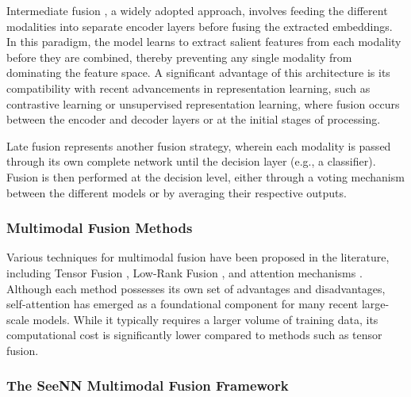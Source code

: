 Intermediate fusion \cite{huang_fusion_2020}, a widely adopted approach, involves feeding the different modalities into separate encoder layers before fusing the extracted embeddings. In this paradigm, the model learns to extract salient features from each modality before they are combined, thereby preventing any single modality from dominating the feature space. A significant advantage of this architecture is its compatibility with recent advancements in representation learning, such as contrastive learning or unsupervised representation learning, where fusion occurs between the encoder and decoder layers or at the initial stages of processing.

Late fusion \cite{huang_fusion_2020} represents another fusion strategy, wherein each modality is passed through its own complete network until the decision layer (e.g., a classifier). Fusion is then performed at the decision level, either through a voting mechanism between the different models or by averaging their respective outputs.

\subsubsection{Multimodal Fusion Methods}

Various techniques for multimodal fusion have been proposed in the literature, including Tensor Fusion \cite{zadeh2017tensorfusionnetworkmultimodal}, Low-Rank Fusion \cite{liu2018efficientlowrankmultimodalfusion}, and attention mechanisms \cite{NEURIPS2021_76ba9f56}. Although each method possesses its own set of advantages and disadvantages, self-attention has emerged as a foundational component for many recent large-scale models. While it typically requires a larger volume of training data, its computational cost is significantly lower compared to methods such as tensor fusion.

\subsubsection{The SeeNN Multimodal Fusion Framework}

\label{subsub:proposed}


